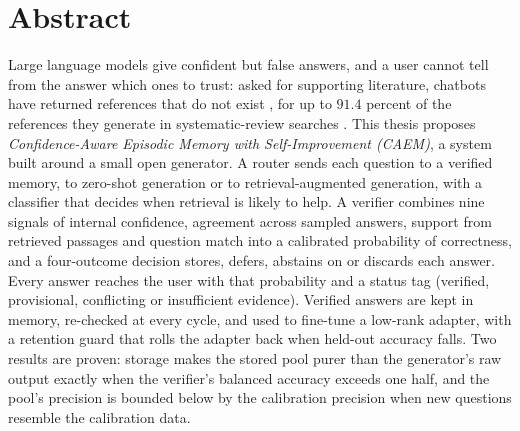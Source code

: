 
\section*{Abstract}

Large language models give confident but false answers, and a user cannot tell from the answer which ones to trust: asked for supporting literature, chatbots have returned references that do not exist \cite{alkaissi2023artificial}, for up to $91.4$ percent of the references they generate in systematic-review searches \cite{info:doi/10.2196/53164}. This thesis proposes \emph{Confidence-Aware Episodic Memory with Self-Improvement (CAEM)}, a system built around a small open generator. A router sends each question to a verified memory, to zero-shot generation or to retrieval-augmented generation, with a classifier that decides when retrieval is likely to help. A verifier combines nine signals of internal confidence, agreement across sampled answers, support from retrieved passages and question match into a calibrated probability of correctness, and a four-outcome decision stores, defers, abstains on or discards each answer. Every answer reaches the user with that probability and a status tag (verified, provisional, conflicting or insufficient evidence). Verified answers are kept in memory, re-checked at every cycle, and used to fine-tune a low-rank adapter, with a retention guard that rolls the adapter back when held-out accuracy falls. Two results are proven: storage makes the stored pool purer than the generator's raw output exactly when the verifier's balanced accuracy exceeds one half, and the pool's precision is bounded below by the calibration precision when new questions resemble the calibration data.


